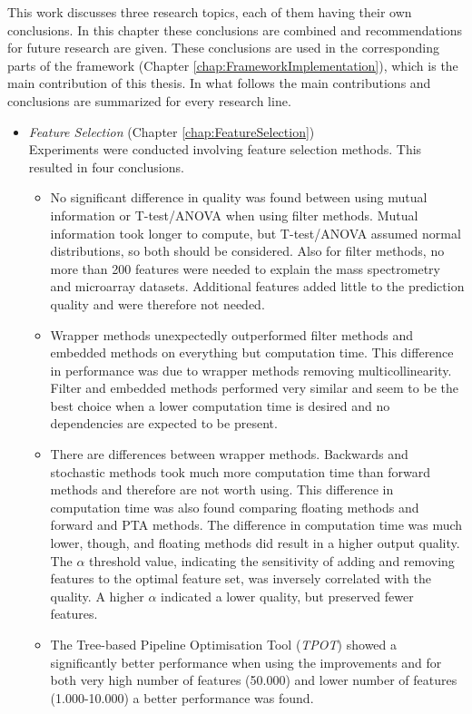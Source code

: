 \documentclass[10pt,a4paper]{report}
\begin{document}
	This work discusses three research topics, each of them having their own conclusions. In this chapter these conclusions are combined and recommendations for future research are given. These conclusions are used in the corresponding parts of the framework (Chapter \ref{chap:FrameworkImplementation}), which is the main contribution of this thesis. In what follows the main contributions and conclusions are summarized for every research line.
	
	\begin{itemize}
		\item \textit{Feature Selection} (Chapter \ref{chap:FeatureSelection})  \\
		Experiments were conducted involving feature selection methods. This resulted in four conclusions.
	\begin{itemize}
		\item No significant difference in quality was found between using mutual information or T-test/ANOVA when using filter methods. Mutual information took longer to compute, but T-test/ANOVA assumed normal distributions, so both should be considered. Also for filter methods, no more than 200 features were needed to explain the mass spectrometry and microarray datasets. Additional features added little to the prediction quality and were therefore not needed.
		\item Wrapper methods unexpectedly outperformed filter methods and embedded methods on everything but computation time. This difference in performance was due to wrapper methods removing multicollinearity. Filter and embedded methods performed very similar and seem to be the best choice when a lower computation time is desired and no dependencies are expected to be present. 
		\item There are differences between wrapper methods. Backwards and stochastic methods took much more computation time than forward methods and therefore are not worth using. This difference in computation time was also found comparing floating methods and forward and PTA methods. The difference in computation time was much lower, though, and floating methods did result in a higher output quality. The $\alpha$ threshold value, indicating the sensitivity of adding and removing features to the optimal feature set, was inversely correlated with the quality. A higher $\alpha$ indicated a lower quality, but preserved fewer features.
		\item The Tree-based Pipeline Optimisation Tool (\textit{TPOT}) showed a significantly better performance when using the improvements and for both very high number of features (50.000) and lower number of features (1.000-10.000) a better performance was found.
	\end{itemize}
			

\end{itemize}
\end{document}
